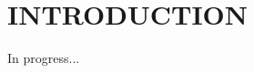 %
%
%
%



\pagestyle{plain} %
\setcounter{page}{1}


\chapter{\uppercase {Introduction}}

In progress...









